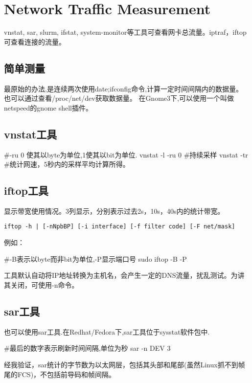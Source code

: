 


\section{Network Traffic Measurement} \label{sec:netmeasure} 
vnstat, sar, slurm, ifstat, system-monitor等工具可查看网卡总流量。iptraf，iftop可查看连接的流量。

\subsection{简单测量}
最原始的办法,是连续两次使用date;ifconfig命令,计算一定时间间隔内的数据量。
也可以通过查看/proc/net/dev获取数据量。
在Gnome3下,可以使用一个叫做netspeed的gnome shell插件。

\subsection{vnstat工具}
\begin{shellcmd}
#-ru 0 使其以byte为单位,1使其以bit为单位.
vnstat -l -ru 0 #持续采样 
vnstat -tr #统计网速，5秒内的采样平均计算所得。
\end{shellcmd}

\subsection{iftop工具}
显示带宽使用情况。3列显示，分别表示过去2s，10s，40s内的统计带宽。
\begin{verbatim}
iftop -h | [-nNpbBP] [-i interface] [-f filter code] [-F net/mask]
\end{verbatim}
例如：
\begin{shellcmd}
#-B表示以byte而非bit为单位,-P显示端口号
sudo iftop -B -P 
\end{shellcmd}
工具默认自动将IP地址转换为主机名，会产生一定的DNS流量，扰乱测试。为讲其关闭，可使用-n命令。

\subsection{sar工具}
也可以使用sar工具.在Redhat/Fedora下,sar工具位于sysstat软件包中.
\begin{shellcmd}
#最后的数字表示刷新时间间隔,单位为秒
sar -n DEV 3 
\end{shellcmd}

经我验证，sar统计的字节数为以太网层，包括其头部和尾部(虽然Linux抓不到帧尾的FCS)，不包括前导码和帧间隔。

